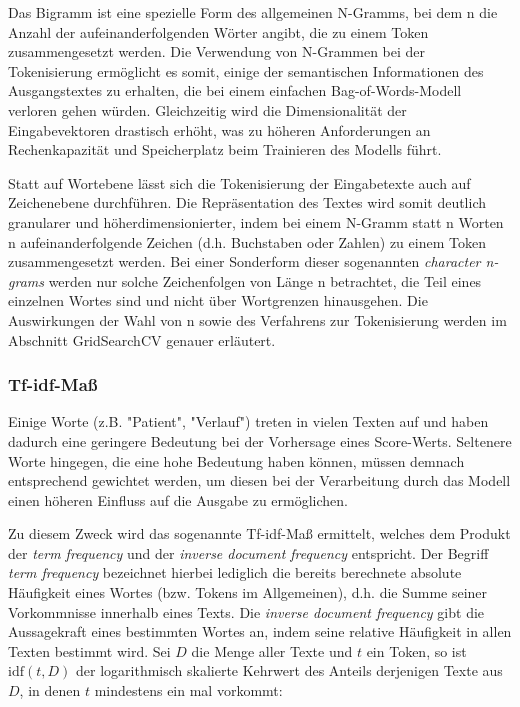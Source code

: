 Das Bigramm ist eine spezielle Form des allgemeinen N-Gramms, bei dem n die Anzahl der aufeinanderfolgenden Wörter angibt, die zu einem Token zusammengesetzt werden. Die Verwendung von N-Grammen bei der Tokenisierung ermöglicht es somit, einige der semantischen Informationen des Ausgangstextes zu erhalten, die bei einem einfachen Bag-of-Words-Modell verloren gehen würden. Gleichzeitig wird die Dimensionalität der Eingabevektoren drastisch erhöht, was zu höheren Anforderungen an Rechenkapazität und Speicherplatz beim Trainieren des Modells führt. 

Statt auf Wortebene lässt sich die Tokenisierung der Eingabetexte auch auf Zeichenebene durchführen. Die Repräsentation des Textes wird somit deutlich granularer und höherdimensionierter, indem bei einem N-Gramm statt n Worten n aufeinanderfolgende Zeichen (d.h. Buchstaben oder Zahlen) zu einem Token zusammengesetzt werden. Bei einer Sonderform dieser sogenannten \textit{character n-grams} werden nur solche Zeichenfolgen von Länge n betrachtet, die Teil eines einzelnen Wortes sind und nicht über Wortgrenzen hinausgehen. Die Auswirkungen der Wahl von n sowie des Verfahrens zur Tokenisierung werden im Abschnitt GridSearchCV genauer erläutert.

\subsubsection{Tf-idf-Maß}
Einige Worte (z.B. "Patient", "Verlauf") treten in vielen Texten auf und haben dadurch eine geringere Bedeutung bei der Vorhersage eines Score-Werts.
Seltenere Worte hingegen, die eine hohe Bedeutung haben können, müssen demnach entsprechend gewichtet werden, um diesen bei der Verarbeitung durch das Modell einen höheren Einfluss auf die Ausgabe zu ermöglichen. 

Zu diesem Zweck wird das sogenannte Tf-idf-Maß ermittelt, welches dem Produkt der \textit{term frequency} und der \textit{inverse document frequency} entspricht. Der Begriff \textit{term frequency} bezeichnet hierbei lediglich die bereits berechnete absolute Häufigkeit eines Wortes (bzw. Tokens im Allgemeinen), d.h. die Summe seiner Vorkommnisse innerhalb eines Texts. Die \textit{inverse document frequency} gibt die Aussagekraft eines bestimmten Wortes an, indem seine relative Häufigkeit in allen Texten bestimmt wird. Sei $D$ die Menge aller Texte und $t$ ein Token, so ist $\mathrm{idf}(t, D)$ der logarithmisch skalierte Kehrwert des Anteils derjenigen Texte aus $D$, in denen $t$ mindestens ein mal vorkommt:

